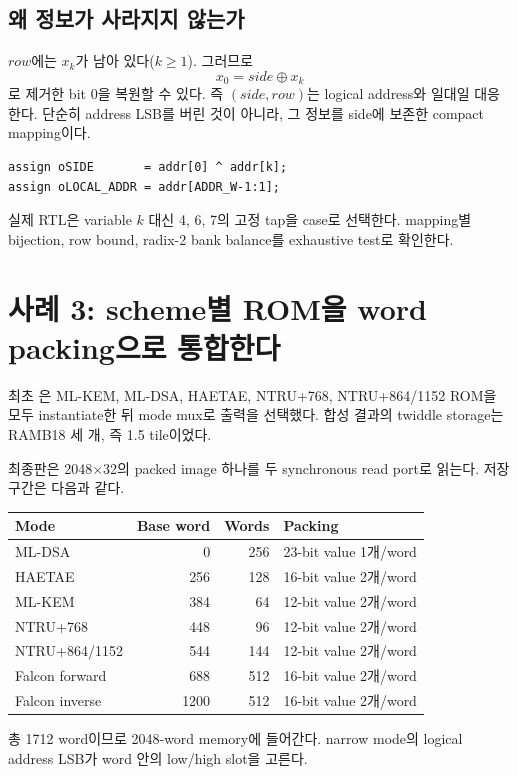 \subsection{왜 정보가 사라지지 않는가}

$row$에는 $x_k$가 남아 있다($k\ge1$). 그러므로
\[
x_0=side\oplus x_k
\]
로 제거한 bit 0을 복원할 수 있다. 즉 $(side,row)$는 logical address와 일대일
대응한다. 단순히 address LSB를 버린 것이 아니라, 그 정보를 side에 보존한
compact mapping이다.

\begin{lstlisting}
assign oSIDE       = addr[0] ^ addr[k];
assign oLOCAL_ADDR = addr[ADDR_W-1:1];
\end{lstlisting}

실제 RTL은 variable $k$ 대신 4, 6, 7의 고정 tap을 case로 선택한다. mapping별
bijection, row bound, radix-2 bank balance를 exhaustive test로 확인한다.

\section{사례 3: scheme별 ROM을 word packing으로 통합한다}

최초 은 ML-KEM, ML-DSA, HAETAE, NTRU+768,
NTRU+864/1152 ROM을 모두 instantiate한 뒤 mode mux로 출력을 선택했다. 합성
결과의 twiddle storage는 RAMB18 세 개, 즉 1.5 tile이었다.

최종판은 2048$\times$32의 packed image 하나를 두 synchronous read port로
읽는다. 저장 구간은 다음과 같다.

\begin{longtable}{L{37mm}r r L{78mm}}
\toprule
Mode & Base word & Words & Packing \\
\midrule
ML-DSA & 0 & 256 & 23-bit value 1개/word \\
HAETAE & 256 & 128 & 16-bit value 2개/word \\
ML-KEM & 384 & 64 & 12-bit value 2개/word \\
NTRU+768 & 448 & 96 & 12-bit value 2개/word \\
NTRU+864/1152 & 544 & 144 & 12-bit value 2개/word \\
Falcon forward & 688 & 512 & 16-bit value 2개/word \\
Falcon inverse & 1200 & 512 & 16-bit value 2개/word \\
\bottomrule
\end{longtable}

총 1712 word이므로 2048-word memory에 들어간다. narrow mode의 logical address
LSB가 word 안의 low/high slot을 고른다.

